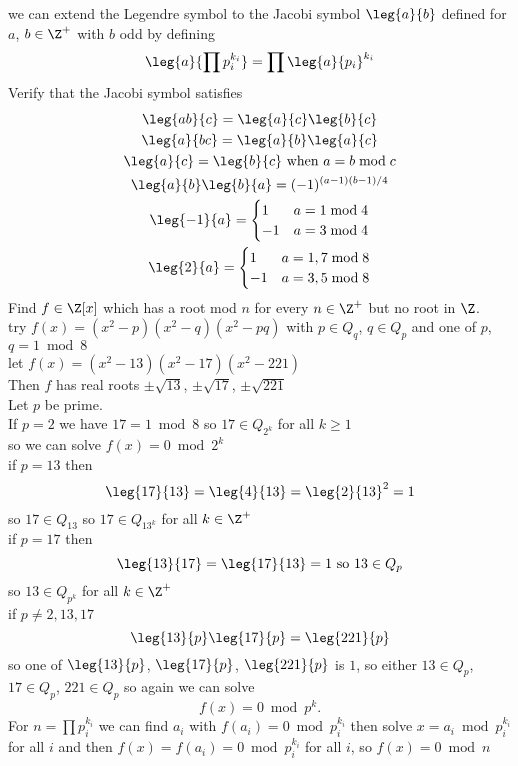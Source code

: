 \remark we can extend the Legendre symbol to the Jacobi symbol $\leg{a}{b}$ defined for $a$, $b\in\Z^+$ with $b$ odd by defining
\[ \leg{a}{\prod p_i^{k_i}} = \prod\leg{a}{p_i}^{k_i} \]
Verify that the Jacobi symbol satisfies
\begin{gather*}
\leg{ab}{c} = \leg{a}{c}\leg{b}{c} \\
\leg{a}{bc} = \leg{a}{b}\leg{a}{c} \\
\leg{a}{c} = \leg{b}{c} \text{ when $a=b\bmod c$} \\
\leg{a}{b}\leg{b}{a} = (-1)^{(a-1)(b-1)/4} \\
\leg{-1}{a} = \begin{cases}
1 & a=1\bmod4 \\
-1 & a=3\bmod4
\end{cases} \\
\leg{2}{a} = \begin{cases}
1 & a=1,7\bmod8 \\
-1 & a=3,5\bmod8
\end{cases}
\end{gather*}
\eg Find $f\in\Z[x]$ which has a root mod $n$ for every $n\in\Z^+$ but no root in $\Z$. \\
\soln try $f(x)=(x^2-p)(x^2-q)(x^2-pq)$ with $p\in Q_q$, $q\in Q_p$ and one of $p$, $q=1\bmod8$ \\
\eg let $f(x)=(x^2-13)(x^2-17)(x^2-221)$ \\
Then $f$ has real roots $\pm\sqrt{13}$, $\pm\sqrt{17}$, $\pm\sqrt{221}$ \\
Let $p$ be prime. \\
If $p=2$ we have $17=1\bmod8$ so $17\in Q_{2^k}$ for all $k\geq1$ \\
so we can solve $f(x)=0\bmod2^k$ \\
if $p=13$ then
\[ \leg{17}{13} = \leg{4}{13} = \leg{2}{13}^2 = 1 \]
so $17\in Q_{13}$ so $17\in Q_{13^k}$ for all $k\in\Z^+$ \\
if $p=17$ then
\[ \leg{13}{17} = \leg{17}{13} = 1 \text{ so $13\in Q_p$} \]
so $13\in Q_{p^k}$ for all $k\in\Z^+$ \\
if $p\neq2,13,17$
\[ \leg{13}{p}\leg{17}{p} = \leg{221}{p} \]
so one of $\leg{13}{p}$, $\leg{17}{p}$, $\leg{221}{p}$ is $1$, so either $13\in Q_p$, $17\in Q_p$, $221\in Q_p$ %
so again we can solve
\[ f(x) = 0 \bmod p^k . \]
For $n=\prod p_i^{k_i}$ we can find $a_i$ with $f(a_i)=0\bmod p_i^{k_i}$ then solve $x=a_i\bmod p_i^{k_i}$ for all $i$ and then $f(x)=f(a_i)=0\bmod p_i^{k_i}$ for all $i$, so $f(x)=0\bmod n$

